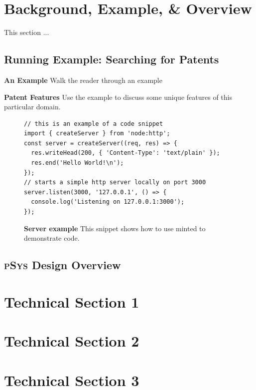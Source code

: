 \documentclass[sigplan, screen, 10pt]{acmart}
\newcommand{\sys}{{\scshape pSys}\xspace}
\begin{document}
\section{Background, Example, \& Overview}
\label{bg}

This section ...

\subsection{Running Example: Searching for Patents}
\label{bg:patents}

\textbf{An Example} Walk the reader through an example

\textbf{Patent Features}
Use the example to discuss some unique features of this particular domain.

\begin{figure}[t]
\centering
\begin{verbatim}
// this is an example of a code snippet
import { createServer } from 'node:http';
const server = createServer((req, res) => {
  res.writeHead(200, { 'Content-Type': 'text/plain' });
  res.end('Hello World!\n');
});
// starts a simple http server locally on port 3000
server.listen(3000, '127.0.0.1', () => {
  console.log('Listening on 127.0.0.1:3000');
});
\end{verbatim}
\caption{
  \textbf{Server example}
  This snippet shows how to use minted to demonstrate code.
}
\label{fig:example}
\end{figure}

\subsection{\sys Design Overview}
\label{bg:overview}

\section{Technical Section 1}
\label{one}

\section{Technical Section 2}
\label{two}

\section{Technical Section 3}
\label{three}
\end{document}
